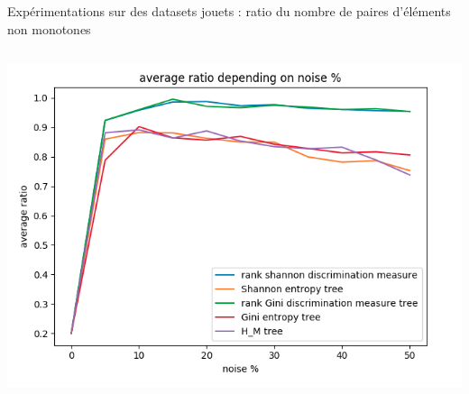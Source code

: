 \documentclass[usenames,dvipsnames]{beamer}
\begin{document}
\begin{frame}{Expérimentations sur des datasets jouets : ratio du nombre de paires d'éléments non monotones}
\begin{columns}
\begin{column}{0.45\textwidth}
            \includegraphics[width=\textwidth]{ratio_5.png}
        \end{column}
    \end{columns}

\end{frame}
\end{document}
